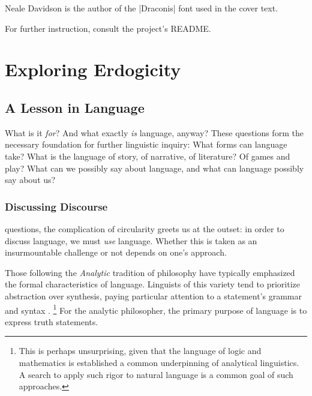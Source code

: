 \documentclass[10pt,twoside,twocolumn,openany,nomultitoc]{book}
\begin{document}
 Neale Davidson is the author of the |Draconis| font used in the cover text.   
     \vspace{4pt} 
     
For further instruction, consult the project's README.      
    
\chapter{Exploring Erdogicity} 
\section{A Lesson in Language}\vspace{2pt}
      What is it \textit{for}?
     And what exactly \textit{is} language, anyway? These questions form the necessary foundation for further linguistic inquiry: What forms can language take? What is the language of story, of narrative, of literature? Of games and play? What can we possibly say about language, and what can language possibly say about us?

\subsection{Discussing Discourse}

 questions, the complication of circularity greets us at the outset: in order to discuss language, we must \textit{use} language. Whether this is taken as an insurmountable challenge or not depends on one's approach.
     
Those following the \textit{Analytic} tradition of philosophy have typically emphasized the formal characteristics of language. Linguists of this variety tend to prioritize abstraction over synthesis, paying particular attention to a statement's grammar and syntax \parencite{putnam1962analytic}.%
    \footnote{This is perhaps unsurprising, given that the language of logic and mathematics is established a common underpinning of analytical linguistics. A search to apply such rigor to natural language is a common goal of such approaches.}
For the analytic philosopher, the primary purpose of language is to express truth statements.  \\
    \vspace{2pt}
\end{document}
